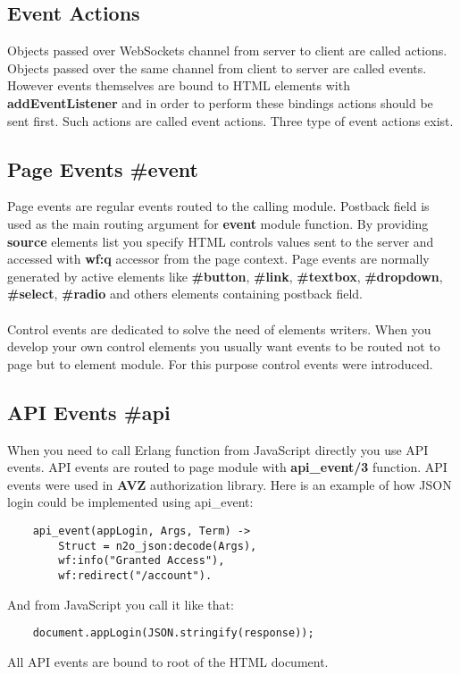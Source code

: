 \subsection*{Event Actions}
Objects passed over WebSockets channel from server to client are called actions.
Objects passed over the same channel from client to server are called events. However
events themselves are bound to HTML elements with {\bf addEventListener} and in order to perform these bindings
actions should be sent first. Such actions are called event actions. Three type
of event actions exist.

\subsection{Page Events \#event}
Page events are regular events routed to the calling module. Postback field is used as the main
routing argument for {\bf event} module function. By providing {\bf source} elements list you specify
HTML controls values sent to the server and accessed with {\bf wf:q} accessor from the page context.
Page events are normally generated by active elements like {\bf \#button}, {\bf \#link},
{\bf \#textbox}, {\bf \#dropdown}, {\bf \#select}, {\bf \#radio} and others elements
containing postback field.

\paragraph{}
Control events are dedicated to solve the need of elements writers. When you develop your
own control elements you usually want events to be routed not to page but to element module.
For this purpose control events were introduced.

\subsection{API Events \#api}
When you need to call Erlang function from JavaScript directly you use API events.
API events are routed to page module with {\bf api\_event/3} function. API events were
used in {\bf AVZ} authorization library. Here is an example of how JSON login could be
implemented using api\_event:

\vspace{1\baselineskip}
\begin{lstlisting}
    api_event(appLogin, Args, Term) ->
        Struct = n2o_json:decode(Args),
        wf:info("Granted Access"),
        wf:redirect("/account").
\end{lstlisting}
\vspace{1\baselineskip}
And from JavaScript you call it like that:
\vspace{1\baselineskip}
\begin{lstlisting}
    document.appLogin(JSON.stringify(response));
\end{lstlisting}
\vspace{1\baselineskip}
All API events are bound to root of the HTML document.


